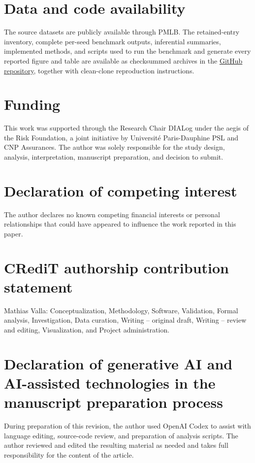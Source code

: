 \documentclass[final,5p,times,twocolumn]{elsarticle}
\begin{document}
\section*{Data and code availability}
The source datasets are publicly available through PMLB. The retained-entry inventory, complete per-seed benchmark outputs, inferential summaries, implemented methods, and scripts used to run the benchmark and generate every reported figure and table are available as checksummed archives in the \href{https://github.com/MathiasValla/EarlyStoppingTrees}{GitHub repository}, together with clean-clone reproduction instructions.

\section*{Funding}
This work was supported through the Research Chair DIALog under the aegis of the Risk Foundation, a joint initiative by Universit\'e Paris-Dauphine PSL and CNP Assurances. The author was solely responsible for the study design, analysis, interpretation, manuscript preparation, and decision to submit.

\section*{Declaration of competing interest}
The author declares no known competing financial interests or personal relationships that could have appeared to influence the work reported in this paper.

\section*{CRediT authorship contribution statement}
Mathias Valla: Conceptualization, Methodology, Software, Validation, Formal analysis, Investigation, Data curation, Writing -- original draft, Writing -- review and editing, Visualization, and Project administration.

\section*{Declaration of generative AI and AI-assisted technologies in the manuscript preparation process}
During preparation of this revision, the author used OpenAI Codex to assist with language editing, source-code review, and preparation of analysis scripts. The author reviewed and edited the resulting material as needed and takes full responsibility for the content of the article.

\small


\end{document}
